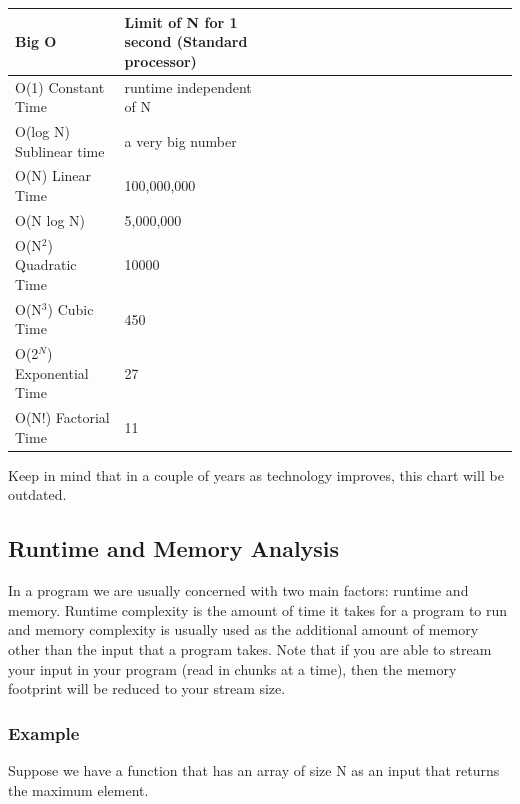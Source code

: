 \documentclass[11pt,oneside]{book}
\begin{document}
\vspace{10px}\begin{tabulary}{0.4\linewidth}{|l|l|l|l|l|l|l|l|l|l|l|l|l|l|l|l|l|l|l}\hline


  Big O &
  Limit of N for 1 second (Standard processor)\\
\hline


  O(1) Constant Time &
  runtime independent of N\\

  O(log N) Sublinear time &
  a very big number\\

  O(N) Linear Time &
  100,000,000\\

  O(N log N) &
  5,000,000\\

  O(N$^{2}$) Quadratic Time &
  10000\\

  O(N$^{3}$) Cubic Time &
  450\\

  O(2$^{N}$) Exponential Time &
  27\\

  O(N!) Factorial Time &
  11\\

\hline\end{tabulary}

Keep in mind that in a couple of years as technology improves, this chart will be outdated.

\subsection{Runtime and Memory Analysis}

In a program we are usually concerned with two main factors: runtime and memory. Runtime complexity is the amount of time it takes for a program to run and memory complexity is usually used as the additional amount of memory other than the input that a program takes. Note that if you are able to stream your input in your program (read in chunks at a time), then the memory footprint will be reduced to your stream size.

\subsubsection{Example}

Suppose we have a function that has an array of size N as an input that returns the maximum element.
\end{document}
